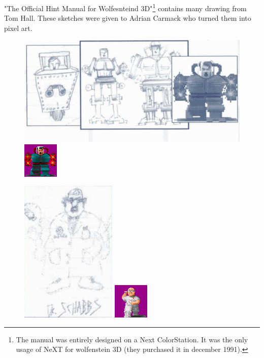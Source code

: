 \documentclass[book.tex]{subfiles}
\begin{document}
"The Official Hint Manual for Wolfesnteind 3D"\footnote{The manual was entirely designed on a Next ColorStation. It was the only usage of NeXT for wolfenstein 3D (they purchased it in december 1991).} contains many drawing from Tom Hall. These sketches were given to Adrian Carmack who turned them into pixel art.\\

  \begin{figure}[H]
\centering
 \includegraphics[scale=0.5]{imgs/tom_hall_sketch_adolf.png}
  \includegraphics[scale=5]{imgs/sprites/adolf.png}
 \end{figure}
 
   \begin{figure}[H]
\centering
 \includegraphics[scale=1]{imgs/tom_hall_sketch_dr_schabbs.png}
   \includegraphics[scale=10]{imgs/sprites/schabbs.png}
 \end{figure}
 
\end{document}
